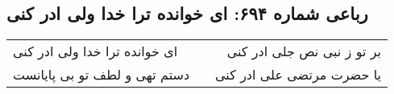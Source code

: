 \begin{center}
\section*{رباعی شماره ۶۹۴: ای خوانده ترا خدا ولی ادر کنی}
\label{sec:sh694}
\begin{longtable}{l p{0.5cm} r}
ای خوانده ترا خدا ولی ادر کنی
&&
بر تو ز نبی نص جلی ادر کنی
\\
دستم تهی و لطف تو بی پایانست
&&
یا حضرت مرتضی علی ادر کنی
\\
\end{longtable}
\end{center}
